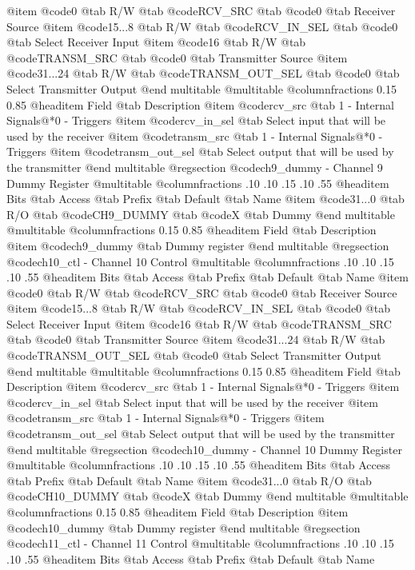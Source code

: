 @item @code{0}
@tab R/W @tab
@code{RCV_SRC}
@tab @code{0} @tab 
Receiver Source
@item @code{15...8}
@tab R/W @tab
@code{RCV_IN_SEL}
@tab @code{0} @tab 
Select Receiver Input
@item @code{16}
@tab R/W @tab
@code{TRANSM_SRC}
@tab @code{0} @tab 
Transmitter Source
@item @code{31...24}
@tab R/W @tab
@code{TRANSM_OUT_SEL}
@tab @code{0} @tab 
Select Transmitter Output
@end multitable
@multitable @columnfractions 0.15 0.85
@headitem Field @tab Description
@item @code{rcv_src} @tab 1 - Internal Signals@*0 - Triggers
@item @code{rcv_in_sel} @tab Select input that will be used by the receiver
@item @code{transm_src} @tab 1 - Internal Signals@*0 - Triggers
@item @code{transm_out_sel} @tab Select output that will be used by the transmitter
@end multitable
@regsection @code{ch9_dummy} - Channel 9 Dummy Register
@multitable @columnfractions .10 .10 .15 .10 .55
@headitem Bits @tab Access @tab Prefix @tab Default @tab Name
@item @code{31...0}
@tab R/O @tab
@code{CH9_DUMMY}
@tab @code{X} @tab 
Dummy
@end multitable
@multitable @columnfractions 0.15 0.85
@headitem Field @tab Description
@item @code{ch9_dummy} @tab Dummy register
@end multitable
@regsection @code{ch10_ctl} - Channel 10 Control
@multitable @columnfractions .10 .10 .15 .10 .55
@headitem Bits @tab Access @tab Prefix @tab Default @tab Name
@item @code{0}
@tab R/W @tab
@code{RCV_SRC}
@tab @code{0} @tab 
Receiver Source
@item @code{15...8}
@tab R/W @tab
@code{RCV_IN_SEL}
@tab @code{0} @tab 
Select Receiver Input
@item @code{16}
@tab R/W @tab
@code{TRANSM_SRC}
@tab @code{0} @tab 
Transmitter Source
@item @code{31...24}
@tab R/W @tab
@code{TRANSM_OUT_SEL}
@tab @code{0} @tab 
Select Transmitter Output
@end multitable
@multitable @columnfractions 0.15 0.85
@headitem Field @tab Description
@item @code{rcv_src} @tab 1 - Internal Signals@*0 - Triggers
@item @code{rcv_in_sel} @tab Select input that will be used by the receiver
@item @code{transm_src} @tab 1 - Internal Signals@*0 - Triggers
@item @code{transm_out_sel} @tab Select output that will be used by the transmitter
@end multitable
@regsection @code{ch10_dummy} - Channel 10 Dummy Register
@multitable @columnfractions .10 .10 .15 .10 .55
@headitem Bits @tab Access @tab Prefix @tab Default @tab Name
@item @code{31...0}
@tab R/O @tab
@code{CH10_DUMMY}
@tab @code{X} @tab 
Dummy
@end multitable
@multitable @columnfractions 0.15 0.85
@headitem Field @tab Description
@item @code{ch10_dummy} @tab Dummy register
@end multitable
@regsection @code{ch11_ctl} - Channel 11 Control
@multitable @columnfractions .10 .10 .15 .10 .55
@headitem Bits @tab Access @tab Prefix @tab Default @tab Name

